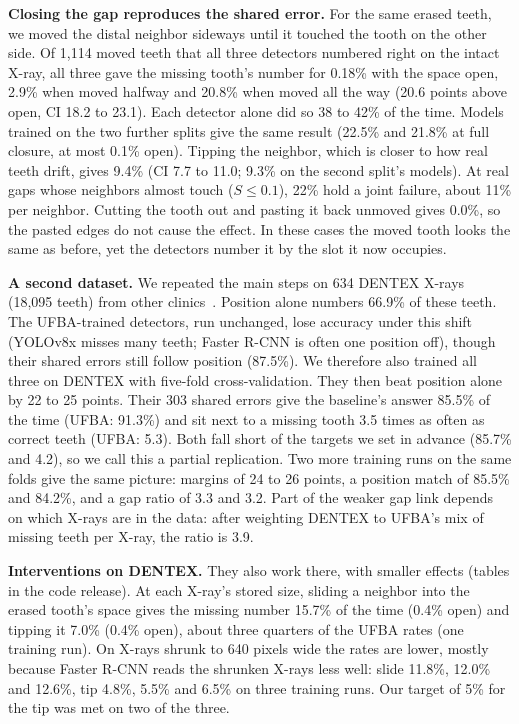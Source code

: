 \documentclass[runningheads]{llncs}
\begin{document}
\textbf{Closing the gap reproduces the shared error.} For the same erased
teeth, we moved the distal neighbor sideways until it touched the tooth on
the other side. Of 1,114 moved teeth that all three detectors numbered right
on the intact X-ray, all three gave the missing tooth's number for 0.18\%
with the space open, 2.9\% when moved halfway and 20.8\% when moved all the
way (20.6 points above open, CI 18.2 to 23.1). Each detector alone did so
38 to 42\% of the time. Models trained on the two further splits give the
same result (22.5\% and 21.8\% at full closure, at most 0.1\% open). Tipping
the neighbor, which is closer to how real teeth drift, gives 9.4\% (CI 7.7 to 11.0; 9.3\% on the second split's models). At real gaps whose neighbors almost touch ($S\le0.1$), 22\% hold a joint failure, about 11\% per neighbor. Cutting the tooth out and pasting it back
unmoved gives 0.0\%, so the pasted edges do not cause the effect. In these cases the moved tooth looks the same as before, yet the detectors number it by the slot it now occupies.

\textbf{A second dataset.} We repeated the main steps on 634 DENTEX X-rays
(18,095 teeth) from other clinics~\cite{hamamci2023dentex}. Position alone
numbers 66.9\% of these teeth. The UFBA-trained detectors, run unchanged,
lose accuracy under this shift (YOLOv8x misses many teeth; Faster R-CNN is
often one position off), though their shared errors still follow position
(87.5\%). We therefore also trained all three on DENTEX with five-fold
cross-validation. They then beat position alone by 22 to 25 points. Their 303
shared errors give the baseline's answer 85.5\% of the time (UFBA: 91.3\%)
and sit next to a missing tooth 3.5 times as often as correct teeth (UFBA:
5.3). Both fall short of the targets we set in advance (85.7\% and 4.2), so we
call this a partial replication. Two more training runs on the same folds give
the same picture: margins of 24 to 26 points, a position match of 85.5\% and
84.2\%, and a gap ratio of 3.3 and 3.2. Part of the weaker gap link depends on
which X-rays are in the data: after weighting DENTEX to UFBA's mix of missing
teeth per X-ray, the ratio is 3.9.

\textbf{Interventions on DENTEX.} They also work there, with smaller
effects (tables in the code release). At each X-ray's stored size,
sliding a neighbor into the erased tooth's space gives the missing number
15.7\% of the time (0.4\% open) and tipping it 7.0\% (0.4\% open), about three
quarters of the UFBA rates (one training run). On X-rays shrunk to 640 pixels
wide the rates are lower, mostly because Faster R-CNN reads the shrunken
X-rays less well: slide 11.8\%, 12.0\% and 12.6\%, tip 4.8\%, 5.5\% and 6.5\%
on three training runs. Our target of 5\% for the tip was met on two of the
three.
\end{document}
